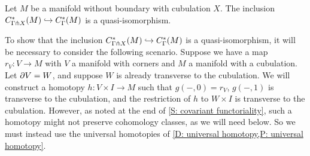 \begin{theorem}\label{T: transverse complex}
	Let $M$ be a manifold without boundary with cubulation $X$.
	The inclusion $C^*_{\Gamma \pitchfork X}(M) \hookrightarrow C^*_\Gamma(M)$ is a quasi-isomorphism.
\end{theorem}

To show that the inclusion $C^*_{\Gamma \pitchfork X}(M) \hookrightarrow C^*_\Gamma(M)$ is a quasi-isomorphism, it will be necessary to consider the following scenario.
Suppose we have a map $r_V \colon V \to M$ with $V$ a manifold with corners and $M$ a manifold with a cubulation.
Let $\partial V = W$, and suppose $W$ is already transverse to the cubulation.
We will construct a homotopy $h \colon V \times I \to M$ such that $g(-,0) = r_V$, $g(-,1)$ is transverse to the cubulation, and the restriction of $h$ to $W \times I$ is transverse to the cubulation. However, as noted at the end of \cref{S: covariant functoriality}, such a homotopy might not preserve cohomology classes, as we will need below. So we must instead use the universal homotopies of \cref{D: universal homotopy,P: universal homotopy}.



